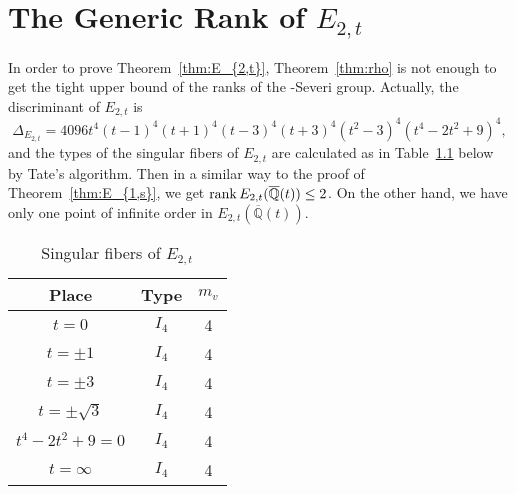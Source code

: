 \documentclass[main]{subfiles}
\begin{document}
\chapter{The Generic Rank of $E_{2,t}$}

In order to prove Theorem~\ref{thm:E_{2,t}}, Theorem~\ref{thm:rho} is not enough to get the tight upper bound of the ranks of the \Neron-Severi group.
Actually, the discriminant of $E_{2,t}$ is 
\begin{equation}
    \Delta_{E_{2,t}} = 4096t^{4}(t - 1)^{4}(t + 1)^{4}(t - 3)^{4}(t + 3)^{4}(t^{2} - 3)^{4}(t^{4} - 2t^{2} + 9)^{4},
\end{equation}
and the types of the singular fibers of $E_{2,t}$ are calculated as in Table~\ref{tab:E_{2,t}} below by Tate's algorithm.
Then in a similar way to the proof of Theorem~\ref{thm:E_{1,s}}, we get $\operatorname{rank} E_{2,t}(\overline{\mathbb{Q}}(t)) \leq 2$.
On the other hand, we have only one point of infinite order in $E_{2,t}(\overline{\mathbb{Q}}(t))$.
\begin{table}[h]
    \centering
    \caption{Singular fibers of $E_{2,t}$}
    \begin{tabular}{|c|c|c|}
        \hline
        Place            & Type  & $m_v$ \\
        \hline
        $t=0$            & $I_4$ & 4     \\
        $t=\pm 1$        & $I_4$ & 4     \\
        $t=\pm 3$        & $I_4$ & 4     \\
        $t=\pm \sqrt{3}$ & $I_4$ & 4     \\
        $t^4-2t^2+9=0$   & $I_4$ & 4     \\
        $t=\infty$       & $I_4$ & 4     \\
        \hline
    \end{tabular}
    \label{tab:E_{2,t}}
\end{table}

\end{document}

